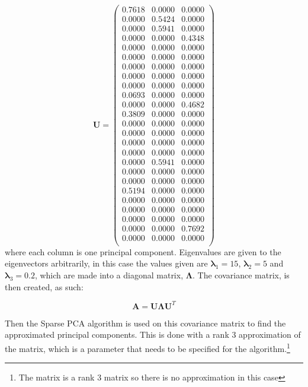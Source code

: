 \documentclass[11pt,a4paper]{article}
\begin{document}
\begin{equation*}
\mathbf{U}= \begin{pmatrix}
0.7618&0.0000&0.0000\\
0.0000&0.5424&0.0000\\
0.0000&0.5941&0.0000\\
0.0000&0.0000&0.4348\\
0.0000&0.0000&0.0000\\
0.0000&0.0000&0.0000\\
0.0000&0.0000&0.0000\\
0.0000&0.0000&0.0000\\
0.0000&0.0000&0.0000\\
0.0693&0.0000&0.0000\\
0.0000&0.0000&0.4682\\
0.3809&0.0000&0.0000\\
0.0000&0.0000&0.0000\\
0.0000&0.0000&0.0000\\
0.0000&0.0000&0.0000\\
0.0000&0.0000&0.0000\\
0.0000&0.5941&0.0000\\
0.0000&0.0000&0.0000\\
0.0000&0.0000&0.0000\\
0.5194&0.0000&0.0000\\
0.0000&0.0000&0.0000\\
0.0000&0.0000&0.0000\\
0.0000&0.0000&0.0000\\
0.0000&0.0000&0.7692\\
0.0000&0.0000&0.0000\\
\end{pmatrix}
\end{equation*}
where each column is one principal component. Eigenvalues are given to the eigenvectors arbitrarily, in this case the values given are $\mathbf{\lambda}_1 = 15$, $\mathbf{\lambda}_2 = 5$ and $\mathbf{\lambda}_3 = 0.2$, which are made into a diagonal matrix, $\mathbf{\Lambda}$. The covariance matrix, is then created, as such:

\begin{equation*}
\mathbf{A} = \mathbf{U}\mathbf{\Lambda}\mathbf{U}^T
\end{equation*}

Then the Sparse PCA algorithm is used on this covariance matrix to find the approximated principal components. This is done with a rank 3 approximation of the matrix, which is a parameter that needs to be specified for the algorithm.\footnote{The matrix is a rank 3 matrix so there is no approximation in this case}
\end{document}
